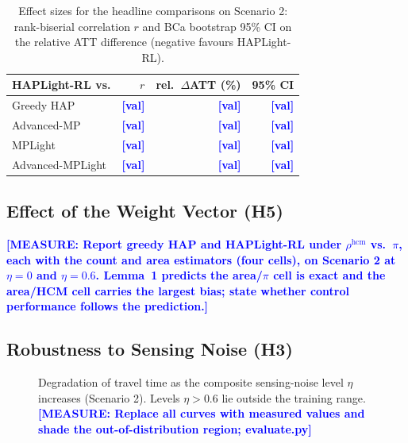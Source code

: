 \documentclass[journal]{IEEEtran}
\newcommand{\note}[1]{\textcolor{blue}{\textbf{[MEASURE: #1]}}}
\newcommand{\pl}{\textcolor{blue}{\textbf{[val]}}}
\begin{document}
\begin{table}[htbp]
\caption{Effect sizes for the headline comparisons on Scenario 2:
rank-biserial correlation $r$ and BCa bootstrap 95\% CI on the relative
ATT difference (negative favours HAPLight-RL).}
\label{tab:effect}
\centering
\footnotesize
\begin{tabularx}{\columnwidth}{@{}Xrrr@{}}
\toprule
HAPLight-RL vs. & $r$ & rel.\ $\Delta$ATT (\%) & 95\% CI \\
\midrule
Greedy HAP        & \pl & \pl & \pl \\
Advanced-MP       & \pl & \pl & \pl \\
MPLight           & \pl & \pl & \pl \\
Advanced-MPLight  & \pl & \pl & \pl \\
\bottomrule
\end{tabularx}
\end{table}

\subsection{Effect of the Weight Vector (H5)}
\label{subsec:weightvec}
\note{Report greedy HAP and HAPLight-RL under $\rho^{\mathrm{hcm}}$ vs.\
$\pi$, each with the count and area estimators (four cells), on
Scenario 2 at $\eta=0$ and $\eta=0.6$. Lemma~1 predicts the area/$\pi$
cell is exact and the area/HCM cell carries the largest bias; state
whether control performance follows the prediction.}

\subsection{Robustness to Sensing Noise (H3)}
\label{subsec:robustness}
\begin{figure}[htbp]
\centering
{}
\caption{Degradation of travel time as the composite sensing-noise level
$\eta$ increases (Scenario 2). Levels $\eta>0.6$ lie outside the
training range. \note{Replace all curves with measured values and shade
the out-of-distribution region; evaluate.py}}
\label{fig:robustness}
\end{figure}
\end{document}
